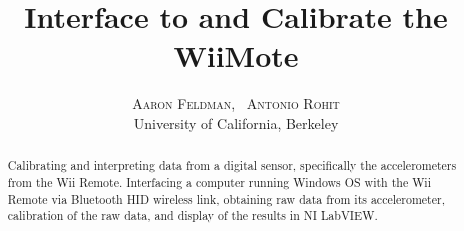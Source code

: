 \documentclass[twoside]{article}
\title{\vspace{-15mm}\fontsize{24pt}{10pt}\selectfont\textbf{Interface to and Calibrate the WiiMote}} %
\author{
\large
\textsc{Aaron Feldman, \ Antonio Rohit}\\[2mm] %
\normalsize University of California, Berkeley \\ %
\normalsize 
\vspace{-5mm}
}
\begin{document}
\maketitle %

\thispagestyle{fancy} %


\begin{abstract}

\noindent Calibrating and interpreting data from a digital sensor, specifically the accelerometers  from the Wii Remote. Interfacing a computer running Windows OS with the Wii Remote via Bluetooth HID wireless link, obtaining raw data from its accelerometer, calibration of the raw data, and display of the results in NI LabVIEW.

\end{abstract}

\end{document}
